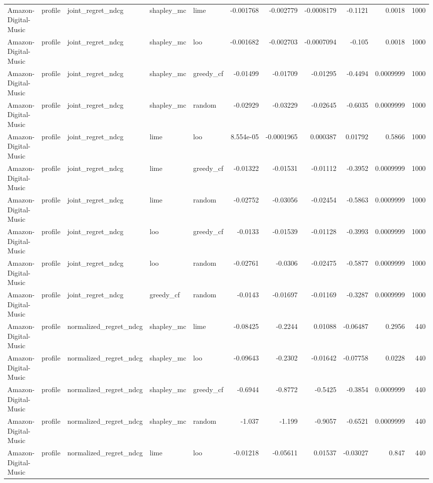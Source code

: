 \begin{table}[t]
\begin{tabular}{lllllrrrrrr}
Amazon-Digital-Music & profile & joint\_regret\_ndcg & shapley\_mc & lime & -0.001768 & -0.002779 & -0.0008179 & -0.1121 & 0.0018 & 1000 \\
Amazon-Digital-Music & profile & joint\_regret\_ndcg & shapley\_mc & loo & -0.001682 & -0.002703 & -0.0007094 & -0.105 & 0.0018 & 1000 \\
Amazon-Digital-Music & profile & joint\_regret\_ndcg & shapley\_mc & greedy\_cf & -0.01499 & -0.01709 & -0.01295 & -0.4494 & 0.0009999 & 1000 \\
Amazon-Digital-Music & profile & joint\_regret\_ndcg & shapley\_mc & random & -0.02929 & -0.03229 & -0.02645 & -0.6035 & 0.0009999 & 1000 \\
Amazon-Digital-Music & profile & joint\_regret\_ndcg & lime & loo & 8.554e-05 & -0.0001965 & 0.000387 & 0.01792 & 0.5866 & 1000 \\
Amazon-Digital-Music & profile & joint\_regret\_ndcg & lime & greedy\_cf & -0.01322 & -0.01531 & -0.01112 & -0.3952 & 0.0009999 & 1000 \\
Amazon-Digital-Music & profile & joint\_regret\_ndcg & lime & random & -0.02752 & -0.03056 & -0.02454 & -0.5863 & 0.0009999 & 1000 \\
Amazon-Digital-Music & profile & joint\_regret\_ndcg & loo & greedy\_cf & -0.0133 & -0.01539 & -0.01128 & -0.3993 & 0.0009999 & 1000 \\
Amazon-Digital-Music & profile & joint\_regret\_ndcg & loo & random & -0.02761 & -0.0306 & -0.02475 & -0.5877 & 0.0009999 & 1000 \\
Amazon-Digital-Music & profile & joint\_regret\_ndcg & greedy\_cf & random & -0.0143 & -0.01697 & -0.01169 & -0.3287 & 0.0009999 & 1000 \\
Amazon-Digital-Music & profile & normalized\_regret\_ndcg & shapley\_mc & lime & -0.08425 & -0.2244 & 0.01088 & -0.06487 & 0.2956 & 440 \\
Amazon-Digital-Music & profile & normalized\_regret\_ndcg & shapley\_mc & loo & -0.09643 & -0.2302 & -0.01642 & -0.07758 & 0.0228 & 440 \\
Amazon-Digital-Music & profile & normalized\_regret\_ndcg & shapley\_mc & greedy\_cf & -0.6944 & -0.8772 & -0.5425 & -0.3854 & 0.0009999 & 440 \\
Amazon-Digital-Music & profile & normalized\_regret\_ndcg & shapley\_mc & random & -1.037 & -1.199 & -0.9057 & -0.6521 & 0.0009999 & 440 \\
Amazon-Digital-Music & profile & normalized\_regret\_ndcg & lime & loo & -0.01218 & -0.05611 & 0.01537 & -0.03027 & 0.847 & 440 \\

\end{tabular}
\end{table}
